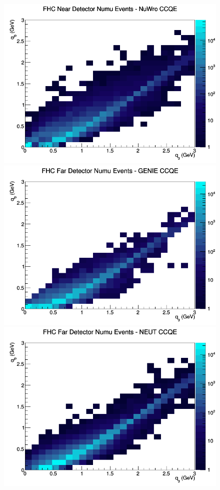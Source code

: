 \begin{figure}[h]
\includegraphics[width=\linewidth]{eff_q0_q3/FGT/CCQE_FHC_ND_numu_q3_q0_NuWro.png}
\endminipage
\newline
{}
\includegraphics[width=\linewidth]{eff_q0_q3/FGT/CCQE_FHC_FD_numu_q3_q0_GENIE.png}
\endminipage
{}
\includegraphics[width=\linewidth]{eff_q0_q3/FGT/CCQE_FHC_FD_numu_q3_q0_NEUT.png}

\end{figure}
